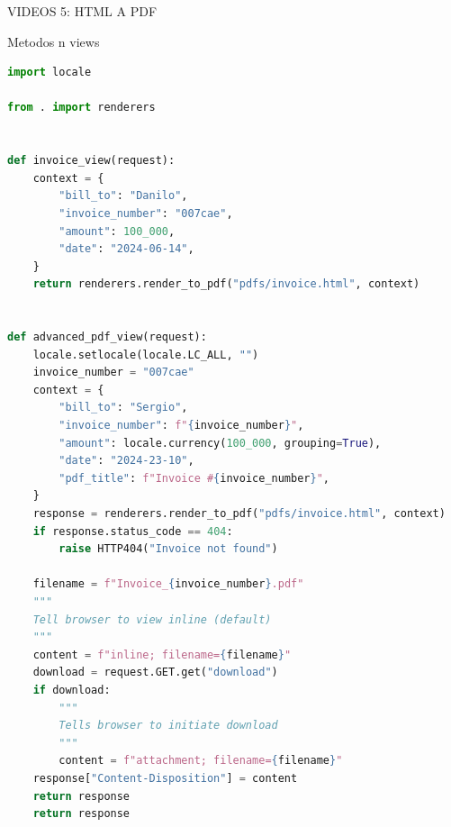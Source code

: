\documentclass{article}
\begin{document}
        \item VIDEOS 5: HTML A PDF
        \item Metodos n views
        \begin{lstlisting}[language=Python, caption=views.py]
import locale

from . import renderers


def invoice_view(request):
    context = {
        "bill_to": "Danilo",
        "invoice_number": "007cae",
        "amount": 100_000,
        "date": "2024-06-14",
    }
    return renderers.render_to_pdf("pdfs/invoice.html", context)


def advanced_pdf_view(request):
    locale.setlocale(locale.LC_ALL, "")
    invoice_number = "007cae"
    context = {
        "bill_to": "Sergio",
        "invoice_number": f"{invoice_number}",
        "amount": locale.currency(100_000, grouping=True),
        "date": "2024-23-10",
        "pdf_title": f"Invoice #{invoice_number}",
    }
    response = renderers.render_to_pdf("pdfs/invoice.html", context)
    if response.status_code == 404:
        raise HTTP404("Invoice not found")

    filename = f"Invoice_{invoice_number}.pdf"
    """
    Tell browser to view inline (default)
    """
    content = f"inline; filename={filename}"
    download = request.GET.get("download")
    if download:
        """
        Tells browser to initiate download
        """
        content = f"attachment; filename={filename}"
    response["Content-Disposition"] = content
    return response
    return response
        \end{lstlisting}  
\end{document}
